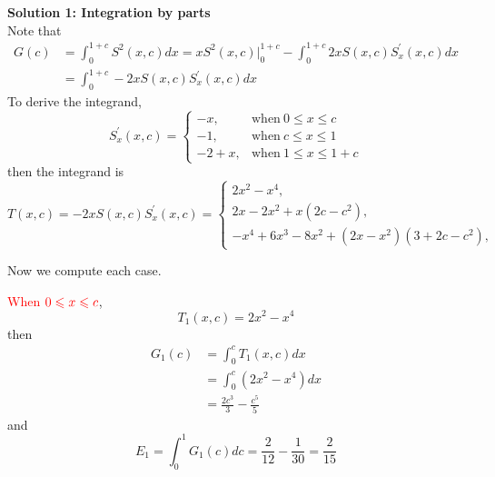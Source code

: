 \documentclass[12pt]{simple_doc}
\begin{document}
    \medskip
    \textbf{Solution 1: Integration by parts}\\
    Note that
    \begin{equation*}
        \begin{aligned}
            G(c) &= \int_0^{1 + c} S^2(x, c) dx = xS^2(x, c)\biggr\rvert_0^{1+c}
                    - \int_0^{1 + c} 2xS(x,c)S_x^{'}(x,c) dx\\
                 &= \int_0^{1 + c} -2xS(x,c)S_x^{'}(x,c) dx
        \end{aligned}
    \end{equation*}
    To derive the integrand,
    \begin{equation*}
        S_x^{'}(x, c) =
            \begin{cases}
              -x, & \text{when}\ 0 \leqslant x \leqslant c\\
              -1, & \text{when}\ c \leqslant x \leqslant 1\\
              -2 +x, & \text{when}\ 1 \leqslant x \leqslant 1 + c
            \end{cases}
    \end{equation*}
    then the integrand is
    \begin{equation*}
        T(x, c) = -2xS(x, c)S_x^{'}(x, c) =
            \begin{cases}
              2x^2 - x^4, &\\
              2x - 2x^2 + x(2c - c^2), &\\
              -x^4 +6x^3 -8x^2 + (2x - x^2)(3 + 2c - c^2), &
            \end{cases}
    \end{equation*}

    Now we compute each case.

    \textcolor{red}{When} $\color{red} 0 \leqslant x \leqslant c$,
    \begin{equation*}
        T_1(x, c) = 2x^2 - x^4
    \end{equation*}
    then
    \begin{equation*}
		\begin{aligned}
		G_1(c) &= \int_0^c T_1(x, c) dx \\
		   &= \int_0^c (2x^2 - x^4) dx\\
           &= \frac{2c^3}{3} - \frac{c^5}{5}
		\end{aligned}
	\end{equation*}
    and
    \begin{equation*}
        E_1 = \int_0^1 G_1(c)dc = \frac{2}{12} - \frac{1}{30} = \frac{2}{15}
    \end{equation*}
\end{document}
